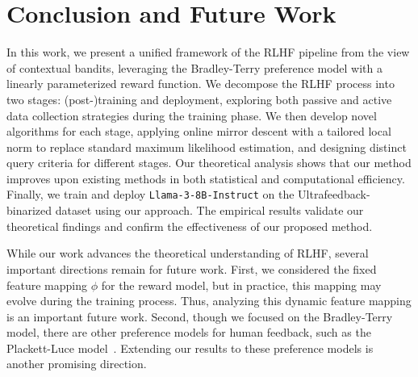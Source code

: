 \section{Conclusion and Future Work}
\label{sec:conclusion}

In this work, we present a unified framework of the RLHF pipeline from the view of contextual bandits, leveraging the Bradley-Terry preference model with a linearly parameterized reward function. We decompose the RLHF process into two stages: (post-)training and deployment, exploring both passive and active data collection strategies during the training phase. We then develop novel algorithms for each stage, applying online mirror descent with a tailored local norm to replace standard maximum likelihood estimation, and designing distinct query criteria for different stages. Our theoretical analysis shows that our method improves upon existing methods in both statistical and computational efficiency. Finally, we train and deploy \texttt{Llama-3-8B-Instruct} on the \mbox{Ultrafeedback-binarized} dataset using our approach. The empirical results validate our theoretical findings and confirm the effectiveness of our proposed method.

While our work advances the theoretical understanding of RLHF, several important directions remain for future work. First, we considered the fixed feature mapping $\phi$ for the reward model, but in practice, this mapping may evolve during the training process. Thus, analyzing this dynamic feature mapping is an important future work. Second, though we focused on the Bradley-Terry model, there are other preference models for human feedback, such as the Plackett-Luce model~\citep{59:Luce-choice,75:Plackett-permutations}. Extending our results to these preference models is another promising direction.  
